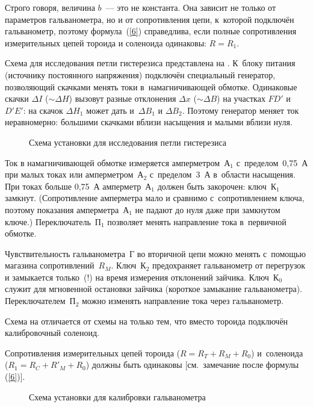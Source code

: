 Строго говоря, величина $b$~--- это не константа. Она зависит не только от параметров гальванометра, но и от
сопротивления цепи, к~которой подключён гальванометр, поэтому формула~(\eqref{6}) справедлива, если полные сопротивления
измерительных цепей тороида и соленоида одинаковы: $R = R_1$.

\experiment

Схема для исследования петли гистерезиса представлена на . К~блоку питания (источнику постоянного напряжения)
подключён специальный генератор, позволяющий скачками менять токи в~намагничивающей обмотке. Одинаковые скачки $\Delta I$
(${\sim}\Delta H$) вызовут разные отклонения $\Delta x$ ($\sim \Delta B$) на участках $FD'$ и $D'E'$: на  скачок $\Delta H_1$ может
дать и~$\Delta B_1$ и $\Delta B_2$. Поэтому генератор меняет ток неравномерно: большими скачками вблизи насыщения и малыми
вблизи нуля.

\begin{figure}
	\caption{Схема установки для исследования петли гистерезиса}
\end{figure}

Ток в намагничивающей обмотке измеряется амперметром~А$_1$ с~пределом~0,75~А при малых токах или амперметром~А$_2$
с~пределом~3~А в~области насыщения. При токах больше 0,75~А амперметр~А$_1$ должен быть закорочен: ключ~К$_1$ замкнут.
(Сопротивление амперметра мало и сравнимо с~сопротивлением ключа, поэтому показания амперметра~А$_1$ не падают до нуля
даже при замкнутом ключе.) Переключатель~П$_1$ позволяет менять направление тока в~первичной обмотке.

Чувствительность гальванометра~Г во вторичной цепи можно менять с~помощью магазина сопротивлений~$R_M$. Ключ~К$_2$
предохраняет гальванометр от перегрузок и замыкается только~(!) на время измерения отклонений зайчика. Ключ~К$_0$ служит
для мгновенной остановки зайчика (короткое замыкание гальванометра). Переключателем~П$_2$ можно изменять направление тока
через гальванометр.

Схема на  отличается от схемы на  только тем, что вместо тороида подключён калибровочный соленоид.

Сопротивления измерительных цепей тороида ($R=R_T+ R_M + R_0$) и~соленоида ($R_1=R_C+R'_M+R_0$) должны быть одинаковы
[см.~замечание после формулы (\eqref{6})].

\begin{figure}
	\caption{Схема установки для калибровки гальванометра}
\end{figure}

